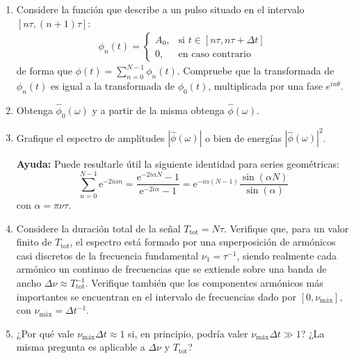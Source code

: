 \documentclass[11pt,spanish]{article}
\begin{document}
\begin{enumerate}
    \begin{enumerate}
        
        \item Considere la función que describe a un pulso situado en el
        intervalo $[n\tau, (n + 1)\tau]$:
        \begin{align}\phi_n(t) =
            \begin{cases}
            A_0, & \text{si } t \in [n\tau,n\tau+\Delta t ] \\
            0, & \text{en caso contrario}
            \end{cases}
        \end{align}
        de forma que $\phi(t) = \sum_{n=0}^{N-1} \phi_n(t)$. Compruebe que la
        transformada de $\phi_n(t)$ es igual a la transformada de $\phi_0(t)$,
        multiplicada por una fase $e^{i n \theta}$.
        
        \item Obtenga $\hat{\phi}_0(\omega)$ y a partir de la misma obtenga
        $\hat{\phi}(\omega)$.
        
        \item Grafique el espectro de amplitudes $|\hat{\phi}(\omega)|$ o bien
        de energías $|\hat{\phi}(\omega)|^2$.
        
        \textbf{Ayuda:} Puede resultarle útil la siguiente identidad para series geométricas: 
        $$\sum_{n=0}^{N-1}\mathrm{e}^{-2i\alpha n}=\frac{\mathrm{e}^{-2i\alpha N}-1}{\mathrm{e}^{-2i\alpha}-1}=\mathrm{e}^{-i\alpha(N-1)}\frac{\sin(\alpha N)}{\sin(\alpha)}$$        
        con $\alpha = \pi \nu \tau$.
        
        \item Considere la duración total de la señal $T_\text{tot}=N\tau$.
        Verifique que, para un valor finito de $T_\text{tot}$, el espectro
        está formado por una superposición de armónicos
        casi discretos de la frecuencia fundamental $\nu_{1}=\tau^{-1}$, siendo
        realmente cada armónico un continuo de frecuencias que se extiende sobre
        una banda de ancho $\Delta\nu\approx T_\text{tot}^{-1}$. Verifique
        también que los componentes armónicos más importantes se encuentran en
        el intervalo de frecuencias dado por $[0, \nu_\text{máx}]$, con
        $\nu_\text{máx} = \Delta t^{-1}$.

        \item ¿Por qué vale $\nu_\text{máx} \Delta t \approx1$ si, en principio,
        podría valer $\nu_\text{máx} \Delta t \gg 1$? ¿La misma pregunta es
        aplicable a $\Delta\nu$ y $T_\text{tot}$?
        

\end{enumerate}
\end{enumerate}
\end{document}
